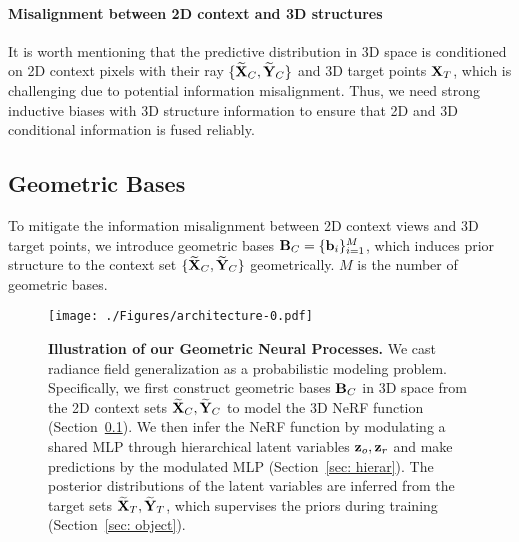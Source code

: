 \paragraph{Misalignment between 2D context and 3D structures} It is worth mentioning that the predictive distribution in 3D space is conditioned on 2D context pixels with their ray $\{{\bf{\widetilde{X}}}_{C}, {\bf{\widetilde{Y}}}_{C}\}$ and 3D target points ${\bf{X}}_{T}$, which is challenging due to potential information misalignment. Thus, we need strong inductive biases with 3D structure information to ensure that 2D and 3D conditional information is fused reliably.




\subsection{Geometric Bases} 
\label{sec: geometrybases}
To mitigate the information misalignment between 2D context views and 3D target points, we introduce geometric bases ${\bf{{B}}}_{C}=\{{\bf{b}}_i\}_{i=1}^{M}$, which {induces prior structure to the context set} $\{{\bf{\widetilde{X}}}_{C}, {\bf{\widetilde{Y}}}_{C}\}$ geometrically. $M$ is the number of geometric bases. 

\begin{figure*}[t]
  \centering  \texttt{[image: ./Figures/architecture-0.pdf]} %
\caption{\textbf{Illustration of our Geometric Neural Processes.} 
We cast radiance field generalization as a probabilistic modeling problem. Specifically, we first construct geometric bases ${\bf{B}}_C$ in 3D space from the 2D context sets ${\bf{\widetilde{X}}}_{C}, {\bf{\widetilde{Y}}}_{C}$ to model the 3D NeRF function (Section~\ref{sec: geometrybases}). We then infer the NeRF function by modulating a shared MLP through hierarchical latent variables ${\bf{z}}_{o}, {\bf{z}}_{r}$ and make predictions by the modulated MLP (Section~\ref{sec: hierar}). 
  The posterior distributions of the latent variables are inferred from the target sets ${\bf{\widetilde{X}}}_{T}, {\bf{\widetilde{Y}}}_{T}$, which supervises the priors during training (Section~\ref{sec: object}). 
  } %
  \label{fig: framework}
\end{figure*}


